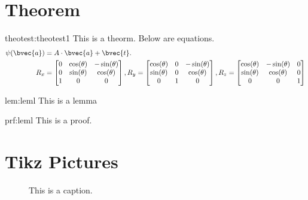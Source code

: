 \section{Theorem}
\begin{theotest}{theotest:theotest1}
This is a theorm. Below are equations.
\begin{align}\label{eq:multi-equations}
    \psi(\bvec{a}) &= A\cdot \bvec{a} + \bvec{t}.\\
    R_x &=  \begin{bmatrix} 
            0 & \cos(\theta) & -\sin(\theta)\\
            0 & \sin(\theta) & \cos(\theta)\\
            1 & 0 & 0
         \end{bmatrix}, 
    R_y =  \begin{bmatrix} 
            \cos(\theta) & 0 & -\sin(\theta)\\
            \sin(\theta) & 0 & \cos(\theta)\\
            0 & 1 & 0
         \end{bmatrix}, 
    R_z =  \begin{bmatrix} 
            \cos(\theta) & -\sin(\theta) & 0\\
            \sin(\theta) & \cos(\theta) & 0 \\
            0 & 0 & 1
         \end{bmatrix} 
\end{align}
\end{theotest}

\begin{lem}{lem:leml}
This is a lemma
\end{lem}

\begin{prf}{prf:leml}
This is a proof.
\end{prf}

\section{Tikz Pictures}
\begin{figure}[htp]
    \centering
    \caption{This is a caption. }
    \label{fig:rotation}
\end{figure}





